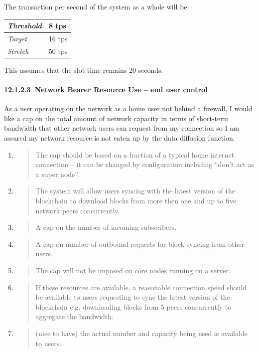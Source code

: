 \documentclass[]{article}
\let\oldparagraph\paragraph
\renewcommand{\paragraph}[1]{\oldparagraph{#1}\mbox{}}
\begin{document}
The transaction per second of the system as a whole will be:

\begin{longtable}[]{@{}ll@{}}
\toprule
\emph{Threshold} & 8 tps\tabularnewline
\midrule
\endhead
\emph{Target} & 16 tps\tabularnewline
\emph{Stretch} & 50 tps\tabularnewline
\bottomrule
\end{longtable}

This assumes that the slot time remains 20 seconds.

\hypertarget{network-bearer-resource-use-end-user-control}{%
\paragraph{​12.1.2.3​~Network Bearer Resource Use -- end user
control}\label{network-bearer-resource-use-end-user-control}}

As a user operating on the network as a home user not behind a firewall,
I would like a cap on the total amount of network capacity in terms of
short-term bandwidth that other network users can request from my
connection so I am assured my network resource is not eaten up by the
data diffusion function.

\begin{enumerate}
\def\labelenumi{\arabic{enumi}.}
\item
  \begin{quote}
  The cap should be based on a fraction of a typical home internet
  connection -- it can be changed by configuration including ``don't act
  as a super node''.
  \end{quote}
\item
  \begin{quote}
  The system will allow users syncing with the latest version of the
  blockchain to download blocks from more then one and up to five
  network peers concurrently.
  \end{quote}
\item
  \begin{quote}
  A cap on the number of incoming subscribers.
  \end{quote}
\item
  \begin{quote}
  A cap on number of outbound requests for block syncing from other
  users.
  \end{quote}
\item
  \begin{quote}
  The cap will not be imposed on core nodes running on a server.
  \end{quote}
\item
  \begin{quote}
  If these resources are available, a reasonable connection speed should
  be available to users requesting to sync the latest version of the
  blockchain e.g. downloading blocks from 5 peers concurrently to
  aggregate the bandwidth.
  \end{quote}
\item
  \begin{quote}
  (nice to have) the actual number and capacity being used is available
  to users.
  \end{quote}
\end{enumerate}
\end{document}
